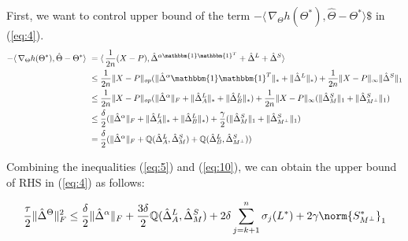 \documentclass{article}
\begin{document}
First, we want to control upper bound of the term $-\langle\,\nabla_{\Theta}h(\Theta^{*}),\hat{\Theta}-\Theta^{*} \rangle\$$
in (\ref{eq:4}).
\begin{align}
-\langle\,\nabla_{\Theta}h(\Theta^{*}),\hat{\Theta}-\Theta^{*} \rangle\ 
&=\langle\, \frac{1}{2n} (X - P), \hat\Delta^{\alpha\mathbbm{1}\mathbbm{1}^T} + \hat\Delta^{L} + \hat\Delta^{S} \rangle\ \\
&\leq \frac{1}{2n} \|X - P\|_{op}(\|\hat{\Delta}^{\alpha}\mathbbm{1}\mathbbm{1}^T\|_\ast + \|\hat{\Delta}^{L}\|_\ast) +  \frac{1}{2n} \|X - P\|_{\infty}\|\hat{\Delta}^{S}\|_{1} \\
&\leq \frac{1}{2n} \|X - P\|_{op}(\|\hat{\Delta}^{\alpha}\|_{F} + \|\hat{\Delta}^{L}_{A}\|_\ast + \|\hat{\Delta}^{L}_{B}\|_\ast) +
\frac{1}{2n} \|X - P\|_{\infty}(\|\hat{\Delta}^{S}_{M}\|_{1} + 
\|\hat{\Delta}^{S}_{M^{\perp}}\|_{1}) \\ 
&\leq \frac{\delta}{2}(\|\hat{\Delta}^{\alpha}\|_{F} + \|\hat{\Delta}^{L}_{A}\|_\ast + \|\hat{\Delta}^{L}_{B}\|_\ast) + \frac{\gamma}{2}(\|\hat{\Delta}^{S}_{M}\|_{1} + 
\|\hat{\Delta}^{S}_{M^{\perp}}\|_{1}) \\
&= \frac{\delta}{2}(\|\hat{\Delta}^{\alpha}\|_{F} +     \mathbb{Q}(\hat{\Delta}^L_{A},\hat{\Delta}^S_{M}) + \mathbb{Q}(\hat{\Delta}^L_{B},\hat{\Delta}^S_{M^\perp}) ) \label{eq:10}
\end{align}

Combining the inequalities (\ref{eq:5}) and (\ref{eq:10}), we can obtain the upper bound of RHS in (\ref{eq:4}) as follows:

\begin{equation}
    \frac{\tau}{2}\|\hat{\Delta}^{\Theta}\|_{F}^{2} \leq
    \frac{\delta}{2}\|\hat{\Delta}^{\alpha}\|_{F} + 
    \frac{3\delta}{2}\mathbb{Q}(\hat{\Delta}^L_{A},\hat{\Delta}^S_{M})
    +2 \delta \sum_{j=k+1}^{n} \sigma_{j}(L^*) + 2\gamma \norm{S^{*}_{M^\perp}}_{1}
\end{equation}
\end{document}
